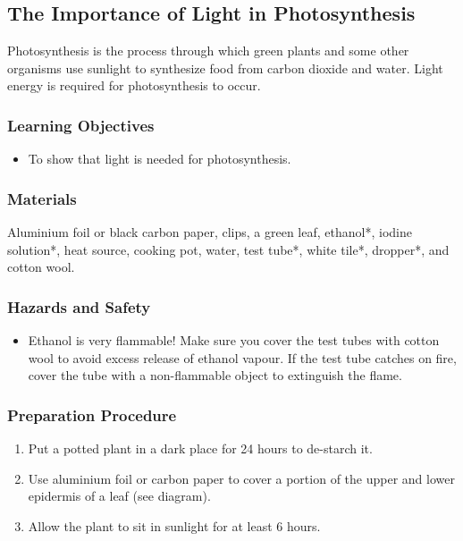 \subsection{The Importance of Light in Photosynthesis}
Photosynthesis is the process through which green plants and some other organisms use sunlight to synthesize food from carbon dioxide and water. Light energy is required for photosynthesis to occur.

\subsubsection*{Learning Objectives}
\begin{itemize}
\item{To show that light is needed for photosynthesis.}
\end{itemize}

\subsubsection*{Materials}
Aluminium foil or black carbon paper, clips, a green leaf, ethanol*, iodine solution*, heat source, cooking pot, water, test tube*, white tile*, dropper*, and cotton wool.

\subsubsection*{Hazards and Safety}
\begin{itemize}
\item{Ethanol is very flammable! Make sure you cover the test tubes with cotton wool to avoid excess release of ethanol vapour. If the test tube catches on fire, cover the tube with a non-flammable object to extinguish the flame.}
\end{itemize}

\subsubsection*{Preparation Procedure}
\begin{enumerate}
\item{Put a potted plant in a dark place for 24 hours to de-starch it.}
\item{Use aluminium foil or carbon paper to cover a portion of the upper and lower epidermis of a leaf (see diagram).}
\item{Allow the plant to sit in sunlight for at least 6 hours.}
\end{enumerate}

